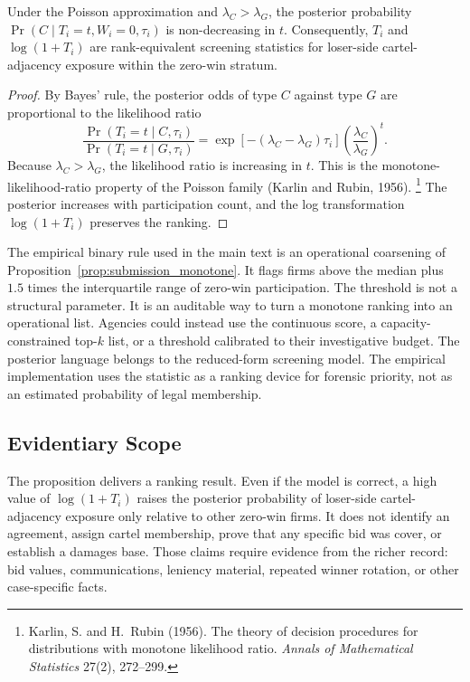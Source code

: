 \begin{proposition}
\label{prop:submission_monotone}
Under the Poisson approximation and $\lambda_C>\lambda_G$, the
posterior probability $\Pr(C\mid T_i=t,W_i=0,\tau_i)$ is
non-decreasing in $t$. Consequently, $T_i$ and
$\log(1+T_i)$ are rank-equivalent screening statistics for
loser-side cartel-adjacency exposure within the zero-win
stratum.
\end{proposition}

\begin{proof}
By Bayes' rule, the posterior odds of type $C$ against type $G$
are proportional to the likelihood ratio
\[
  \frac{\Pr(T_i=t\mid C,\tau_i)}
       {\Pr(T_i=t\mid G,\tau_i)}
  =
  \exp[-(\lambda_C-\lambda_G)\tau_i]
  \left(\frac{\lambda_C}{\lambda_G}\right)^t .
\]
Because $\lambda_C>\lambda_G$, the likelihood ratio is increasing
in $t$. This is the monotone-likelihood-ratio property of the
Poisson family (Karlin and Rubin, 1956).%
\footnote{Karlin, S. and H.~Rubin (1956). The theory of decision
procedures for distributions with monotone likelihood ratio.
\textit{Annals of Mathematical Statistics} 27(2), 272--299.}
The posterior increases
with participation count, and the log transformation
$\log(1+T_i)$ preserves the ranking.
\end{proof}

The empirical binary rule used in the main text is an operational
coarsening of Proposition~\ref{prop:submission_monotone}. It flags firms above the
median plus $1.5$ times the interquartile range of zero-win
participation. The threshold is not a structural parameter. It
is an auditable way to turn a monotone ranking into an
operational list. Agencies could instead use the continuous
score, a capacity-constrained top-$k$ list, or a threshold
calibrated to their investigative budget.
The posterior language belongs to the reduced-form screening
model. The empirical implementation uses the statistic as a
ranking device for forensic priority, not as an estimated
probability of legal membership.

\subsection{Evidentiary Scope}
\label{app:framework_scope}

The proposition delivers a ranking result. Even if the model is
correct, a high value of
$\log(1+T_i)$ raises the posterior probability of loser-side
cartel-adjacency exposure only relative to other zero-win firms.
It does not
identify an agreement, assign cartel membership, prove that any
specific bid was cover, or establish a damages base. Those
claims require evidence from the richer record: bid values,
communications, leniency material, repeated winner rotation, or
other case-specific facts.

